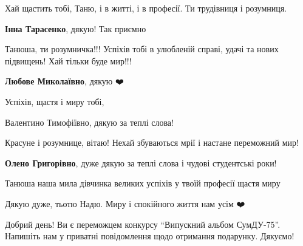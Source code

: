 
Хай щастить тобі, Таню, і в житті, і в професії. Ти трудівниця і розумниця.

\begin{itemize} %
\textbf{Інна Тарасенко}, дякую! Так приємно 🥰
\end{itemize} %


Танюша, ти розумничка!!! Успіхів тобі в улюбленій справі, удачі та нових підвищень! Хай тільки буде мир!!!

\begin{itemize} %
\textbf{Любове Миколаївно}, дякую ❤️
\end{itemize} %


Успіхів, щастя і миру тобі,

\begin{itemize} %
Валентино Тимофіївно, дякую за теплі слова!
\end{itemize} %


Красуне і розумнице, вітаю! Нехай збуваються мрії і настане переможний мир!

\begin{itemize} %
\textbf{Олено Григорівно}, дуже дякую за теплі слова і чудові студентські роки!
\end{itemize} %


Танюша наша мила дівчинка великих успіхів у твоїй професії щастя миру

\begin{itemize} %
Дякую дуже, тьотю Надю. Миру і спокійного життя нам усім ❤️
\end{itemize} %


Добрий день! Ви є переможцем конкурсу \enquote{Випускний альбом СумДУ-75}.
Напишіть нам у приватні повідомлення щодо отримання подарунку. Дякуємо!
